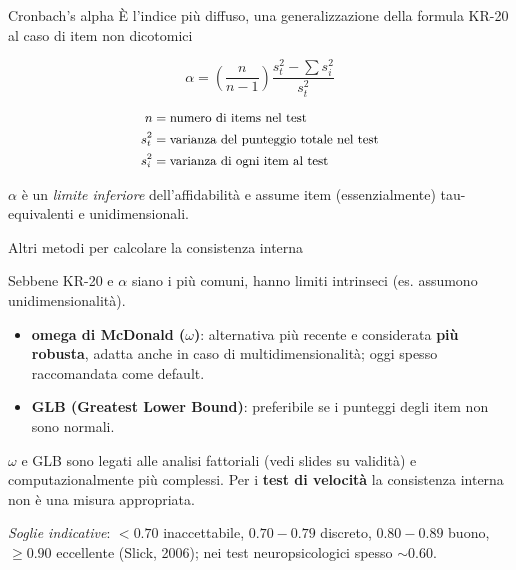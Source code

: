 \documentclass[
  ignorenonframetext,
  aspectratio=169,
]{beamer}
\providecommand{\tightlist}{%
  \setlength{\itemsep}{0pt}\setlength{\parskip}{0pt}}
\begin{document}
\begin{frame}{Cronbach's alpha}
\label{cronbachs-alpha}
È l'indice più diffuso, una generalizzazione della formula KR-20 al caso
di item non dicotomici

\[
\alpha = \left(\frac{n}{n-1}\right)\frac{s_t^2 - \sum{s_i^2}}{s_t^2}
\]

\[
\small
\begin{aligned}
n & = \text{numero di items nel test} \\
s_t^2 & = \text{varianza del punteggio totale nel test} \\
s_i^2 & = \text{varianza di ogni item al test} \\
\end{aligned}
\]

\footnotesize \(\alpha\) è un \emph{limite inferiore} dell'affidabilità
e assume item (essenzialmente) tau-equivalenti e unidimensionali.
\end{frame}

\begin{frame}{Altri metodi per calcolare la consistenza interna}
\label{altri-metodi-per-calcolare-la-consistenza-interna}
\small

Sebbene KR-20 e \(\alpha\) siano i più comuni, hanno limiti intrinseci
(es. assumono unidimensionalità).

\begin{itemize}
\tightlist
\item
  \textbf{omega di McDonald (\(\omega\))}: alternativa più recente e
  considerata \textbf{più robusta}, adatta anche in caso di
  multidimensionalità; oggi spesso raccomandata come default.
\item
  \textbf{GLB (Greatest Lower Bound)}: preferibile se i punteggi degli
  item non sono normali.
\end{itemize}

\(\omega\) e GLB sono legati alle analisi fattoriali (vedi slides su
validità) e computazionalmente più complessi. Per i \textbf{test di
velocità} la consistenza interna non è una misura appropriata.

\emph{Soglie indicative}: \(< 0.70\) inaccettabile, \(0.70 - 0.79\)
discreto, \(0.80 - 0.89\) buono, \(\geq 0.90\) eccellente (Slick, 2006);
nei test neuropsicologici spesso \(\sim 0.60\).
\end{frame}
\end{document}
